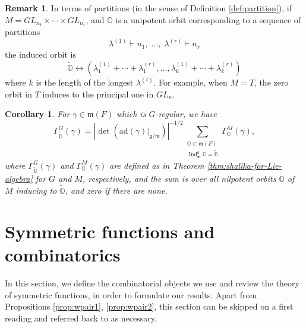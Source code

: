 \documentclass{amsart}
\numberwithin{equation}{section}
\newtheorem{corollary}[lemma]{Corollary}%
\theoremstyle{definition}
\newtheorem{remark}[lemma]{Remark}%
\def\tilde{\widetilde}
\DeclareMathOperator{\Ind}{\mathrm{Ind}}
\newcommand{\fm}{\mathfrak{m}}
\newcommand{\fg}{\mathfrak{g}}
\newcommand{\ad}{\mathrm{ad}}
\begin{document}
\begin{remark}
In terms of partitions (in the sense of Definition \ref{def:partition}), if $M=GL_{n_1}\times\cdots\times GL_{n_r}$, and $\mathbb{O}$ is a unipotent orbit corresponding to a sequence of partitions $$\lambda^{(1)}\vdash n_1,\;\ldots,\; \lambda^{(r)}\vdash n_r$$ the induced orbit is $$\tilde{\mathbb{O}}\leftrightarrow (\lambda_1^{(1)}+\cdots+\lambda^{(r)}_1,\ldots,\lambda_k^{(1)}+\cdots+\lambda_k^{(r)})$$ where $k$ is the length of the longest $\lambda^{(i)}$. For example, when $M=T$, the zero orbit in $T$ induces to the principal one in $GL_n$.

\end{remark}

\begin{corollary}
\label{cor:inducedorbits}
For $\gamma\in\fm(F)$ {\em which is $G$-regular}, we have
\[
\Gamma_{\tilde{\mathbb{O}}}^G(\gamma)=\left|\det(\ad(\gamma)|_{\fg/\fm})\right|^{-1/2}\sum_{\substack{\mathbb{O}\subset \fm(F) \\ \Ind_{\fm}^{\fg}\mathbb{O}=\tilde{\mathbb{O}}}}\Gamma_{\mathbb{O}}^M(\gamma),
\]
where $\Gamma_{\tilde{\mathbb{O}}}^G(\gamma)$ and $\Gamma_{\mathbb{O}}^M(\gamma)$ are defined as in Theorem \ref{thm:shalika-for-Lie-algebra} for $G$ and $M$, respectively, and the sum is over all nilpotent orbits $\mathbb{O}$ of $M$ inducing to $\tilde{\mathbb{O}}$, and zero if there are none.
\end{corollary}


\section{Symmetric functions and combinatorics}
\label{sec:symfns}
In this section, we define the combinatorial objects we use and review the theory of symmetric functions, in order to formulate our results. Apart from Propositions \ref{prop:wpair1}, \ref{prop:wpair2}, this section can be skipped on a first reading and referred back to as necessary.
\end{document}
